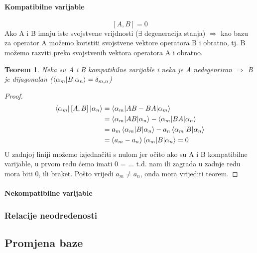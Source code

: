 \documentclass{article}
\newtheorem{theorem}{Teorem}[section]
\newtheorem{proof}{Dokaz}[section]
\numberwithin{equation}{section}
\begin{document}
\paragraph{Kompatibilne varijable} 

\begin{equation}
	\left[A,B\right] = 0
\end{equation}
Ako A i B imaju iste svojstvene vrijdnosti ($\exists$ degeneracija stanja) $\Rightarrow$ kao bazu za operator 
A možemo koristiti svojstvene vektore operatora B i obratno, tj. B možemo razviti preko svojstvenih vektora operatora A i obratno.
\begin{theorem}
	Neka su A i B kompatibilne varijable i neka je A nedegenriran $\Rightarrow$ B je dijagonalan ($\braket{\alpha_m|B|\alpha_n} = \delta_{m,n}$)
\end{theorem}
\begin{proof}
	\begin{equation}
		\begin{aligned}
			\braket{\alpha_m|\left[A,B\right]|\alpha_n} &= \braket{\alpha_m|AB-BA|\alpha_m}\\
																									&=\braket{\alpha_m|AB|\alpha_n} - \braket{\alpha_m|BA|\alpha_n}\\
																									&= a_m \braket{\alpha_m|B|\alpha_n} - a_n\braket{\alpha_m|B|\alpha_n}\\
																									&=\left(a_m - a_n \right) \braket{\alpha_m|B|\alpha_n} = 0
		\end{aligned}
	\end{equation}
	U zadnjoj liniji možemo izjednačiti s nulom jer očito ako su A i B kompatibilne varijable, u prvom redu ćemo imati 0 = ...
	t.d. nam ili zagrada u zadnje redu mora biti 0, ili braket. Pošto vrijedi $a_m \ne a_n$, onda mora vrijediti teorem.
\end{proof}


\paragraph{Nekompatibilne varijable}

\subsubsection{Relacije neodređenosti}

\subsection{Promjena baze}
\end{document}
